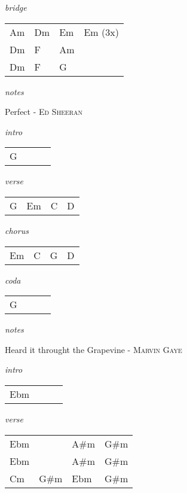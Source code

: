 \documentclass[12pt]{article}
\begin{document}
\textit{bridge}

\begin{tabular}{|P{1.25in}|P{1.25in}|P{1.25in}|P{1.25in}|}
  Am & Dm  &  Em & Em (3x) \\
  Dm &  F   &  Am &   \\
  Dm &  F   &  G  &  \\
\end{tabular}

\textit{notes}

\newpage

{\Huge Perfect} {\huge - \textsc{Ed Sheeran}}

\huge
\textit{intro}

\begin{tabular}{|P{1.25in}|P{1.25in}|P{1.25in}|P{1.25in}|}
  G &   &   &   \\
\end{tabular}

\textit{verse}

\begin{tabular}{|P{1.25in}|P{1.25in}|P{1.25in}|P{1.25in}|}
  G &  Em & C  & D  \\
\end{tabular}

\textit{chorus}

\begin{tabular}{|P{1.25in}|P{1.25in}|P{1.25in}|P{1.25in}|}
  Em &  C &  G &  D \\
\end{tabular}

\textit{coda}

\begin{tabular}{|P{1.25in}|P{1.25in}|P{1.25in}|P{1.25in}|}
  G &   &   &   \\
\end{tabular}

\textit{notes}

\newpage

{\Huge Heard it throught the Grapevine} {\huge - \textsc{Marvin Gaye}}

\huge
\textit{intro}

\begin{tabular}{|P{1.25in}|P{1.25in}|P{1.25in}|P{1.25in}|}
  Ebm &   &   &   \\
\end{tabular}

\textit{verse}

\begin{tabular}{|P{1.25in}|P{1.25in}|P{1.25in}|P{1.25in}|}
  Ebm &   & A\#m  & G\#m  \\
  Ebm &   & A\#m  & G\#m  \\
  Cm  &  G\#m & Ebm & G\#m \\
\end{tabular}
\end{document}
